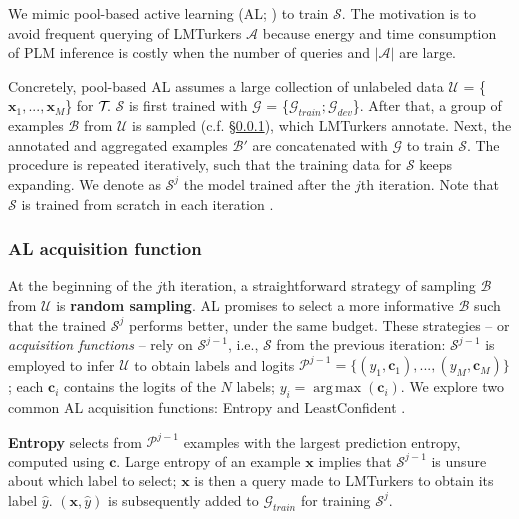 \documentclass[11pt]{article}
\DeclareMathOperator*{\argmax}{arg\,max}
\def\tasksymbol{$\mathcal{T\mkern-5mu}$\xspace}
\def\mdrs{LMTurkers\xspace}
\def\secref#1{\S\ref{sec:#1}}
\def\seclabel#1{\label{sec:#1}}
\begin{document}
We mimic
pool-based active learning (AL; \citet{settles2009active})
to train $\mathcal{S}$.
The motivation is to
avoid frequent 
querying of \mdrs
$\mathcal{A}$ because
energy and time consumption
of PLM inference  is
costly
when
the number of queries
and $|\mathcal{A}|$ are large.

Concretely, pool-based AL
assumes a large
collection of unlabeled data
$\mathcal{U}$ = \{$\mathbf{x}_1,...,\mathbf{x}_M$\}
for \tasksymbol.
$\mathcal{S}$ is first trained with
$\mathcal{G}$ = \{$\mathcal{G}_{train}; \mathcal{G}_{dev}$\}.
After that,  a group of examples
$\mathcal{B}$ from $\mathcal{U}$ is sampled (c.f. \secref{alacquisition}),
which \mdrs  annotate.
Next, the annotated and aggregated examples 
$\mathcal{B'}$ are concatenated with
$\mathcal{G}$ to train $\mathcal{S}$.
The procedure is repeated iteratively,
such that the training data for
$\mathcal{S}$ keeps expanding.
We denote as $\mathcal{S}^j$ the model trained after
the $j$th iteration.
Note that $\mathcal{S}$ is trained from
scratch in each iteration \citep{cohn1994improving}.

\subsubsection{AL acquisition function}
\seclabel{alacquisition}
At the beginning of the $j$th iteration, 
a straightforward strategy
of sampling $\mathcal{B}$ from $\mathcal{U}$
is \textbf{random sampling}.
AL promises to select
a more informative $\mathcal{B}$
such that the trained
$\mathcal{S}^j$ performs better,
under the same budget.
These strategies -- or
\emph{acquisition functions} -- 
rely on $\mathcal{S}^{j-1}$,
i.e.,
$\mathcal{S}$
from the previous iteration:
$\mathcal{S}^{j-1}$ is employed to infer
$\mathcal{U}$
to obtain labels and logits
$\mathcal{P}^{j-1} = \{(y_1,\mathbf{c}_1),...,(y_M,\mathbf{c}_M)\}$;
each $\mathbf{c}_i$ contains
the logits of the  $N$ labels;
$y_i=\argmax(\mathbf{c}_i)$.
We explore
two common
AL acquisition functions:
Entropy \citep{roy2001toward}
and
LeastConfident \citep{lewis1994sequential}.



\textbf{Entropy} selects
from $\mathcal{P}^{j-1}$
examples with the
largest prediction entropy,
computed using $\mathbf{c}$.
Large entropy of an example $\mathbf{x}$
implies that $\mathcal{S}^{j-1}$
is unsure about which label to select;
$\mathbf{x}$ is then a query made to \mdrs
to obtain its label $\hat{y}$.
$(\mathbf{x}, \hat{y})$ is subsequently
added to $\mathcal{G}_{train}$ for training $\mathcal{S}^{j}$.
\end{document}
